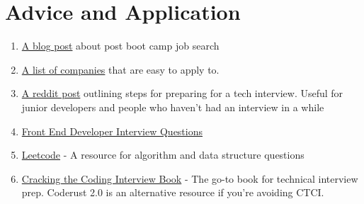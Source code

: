\section{Advice and Application}
\begin{enumerate}
    \item \href{https://www.freecodecamp.org/news/5-key-learnings-from-the-post-bootcamp-job-search-9a07468d2331/}{A blog post} about post boot camp job search
    
    \item \href{https://github.com/j-delaney/easy-application}{A list of companies} that are easy to apply to.
    
    \item \href{https://www.reddit.com/r/cscareerquestions/comments/1jov24/heres_how_to_prepare_for_tech_interviews/}{A reddit post} outlining steps for preparing for a tech interview. Useful for junior developers and people who haven't had an interview in a while
    
    \item \href{https://github.com/h5bp/Front-end-Developer-Interview-Questions}{Front End Developer Interview Questions}
    
    \item \href{https://leetcode.com/}{Leetcode} - A resource for algorithm and data structure questions
    
    \item \href{https://www.crackingthecodinginterview.com/}{Cracking the Coding Interview Book} - The go-to book for technical interview prep. Coderust 2.0 is an alternative resource if you're avoiding CTCI.
\end{enumerate}